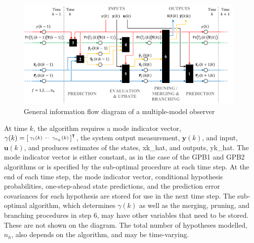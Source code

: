{\begin{figure}[htp]
	\centering
	\includegraphics[width=15.5cm]{images/mkf_infoflow.pdf}
	\caption{General information flow diagram of a multiple-model observer}
	\label{fig:mkf-infoflow}
\end{figure}

At time $k$, the algorithm requires a mode indicator vector, $\gamma(k)=\begin{bsmallmatrix} \gamma_1(k) & \cdots & \gamma_{n_h}(k) \end{bsmallmatrix}^\intercal$, the system output measurement, $\mathbf{y}(k)$, and input, $\mathbf{u}(k)$, and produces estimates of the states, \gls{xk_hat}, and outputs, \gls{yk_hat}. The mode indicator vector is either constant, as in the case of the \gls{GPB1} and \gls{GPB2} algorithms or is specified by the sub-optimal procedure at each time step. At the end of each time step, the mode indicator vector, conditional hypothesis probabilities, one-step-ahead state predictions, and the prediction error covariances for each hypothesis are stored for use in the next time step. The sub-optimal algorithm, which determines $\gamma(k)$ as well as the merging, pruning, and branching procedures in step 6, may have other variables that need to be stored. These are not shown on the diagram. The total number of hypotheses modelled, $n_h$, also depends on the algorithm, and may be time-varying.

}
